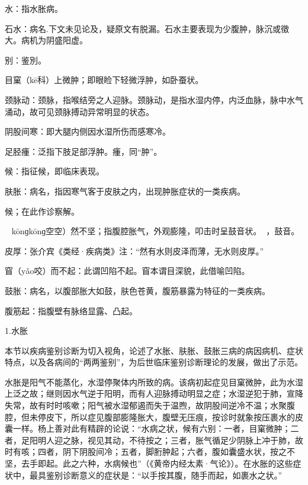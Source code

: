 \documentclass[draft,12pt]{ctexbook}
\begin{document}

\begin{jiaozhu}
  \item 水：指水胀病。
  \item 石水：病名.下文未见论及，疑原文有脱漏。石水主要表现为少腹肿，脉沉或徵大。病机为阴盛阳虚。
  \item 别：鉴別。
  \item 目窠（kē科）上微肿；即眼睑下轻微浮肿，如卧蚕状。
  \item 颈脉动：颈脉，指喉结旁之人迎脉。颈脉动，是指水湿内停，内泛血脉，脉中水气涌动，故可见颈脉搏动异常明显的状态。
  \item 阴股间寒：即大腿内侧因水湿所伤而感寒冷。
  \item 足胫瘇：泛指下肢足部浮肿。瘇，同“肿”。
  \item 候：指征候，即临床表现。
  \item 肤胀：病名，指因寒气客于皮肤之内，出现肿胀症状的一类疾病。
  \item 候；在此作诊察解。
  \item 𪔣𪔣（kōnɡkōnɡ空空）然不坚；指腹腔胀气，外观膨隆，叩击时呈鼓音状。𪔣𪔣，鼓音。
  \item 皮厚：张介宾《类经·疾病类》注：“然有水则皮泽而薄，无水则皮厚。”
  \item 窅（yǎo咬）而不起：此谓凹陷不起。窅本谓目深貌，此借喻凹陷。
  \item 鼓胀：病名，以腹部胀大如鼓，肤色苍黄，腹筋暴露为特征的一类疾病。
  \item 腹筋起：指腹壁有脉络显露、凸起。
\end{jiaozhu}


1.水胀

本节以疾病鉴别诊断为切入视角，论述了水胀、肤胀、鼓胀三病的病因病机、症状特点，以及各病间的“两两鉴别”，为后世临床鉴别诊断理论的发展，做出了示范。

水胀是阳气不能蒸化，水湿停聚体内所致的病。该病初起症见目窠微肿，此为水湿上泛之故；继则因水气逆于阳明，而有人迎脉搏动明显之症；水湿逆犯于肺，宣降失常，故有时时咳嗽；阳气被水湿郁遏而失于温煦，故阴股间逆冷不温；水聚腹腔，但未停皮下，所以症见腹部膨隆胀大，腹壁无压痕，按诊时就象按压裹水的皮囊一样。杨上善对此有精辟的论说：“水病之状，候有六别：一者，目窠微肿；二者，足阳明人迎之脉，视见其动，不待按之；三者，胀气循足少阴脉上冲于肺，故时有咳；四者，阴下阴股间冷；五者，脚胻肿起；六者，腹如囊盛水状，按之不坚，去手即起。此之六种，水病候也”（《黄帝内经太素·气论》）。在水胀的这些症状中，最具鉴别诊断意义的症状是：“以手按其腹，随手而起，如裹水之状。”
\end{document}
